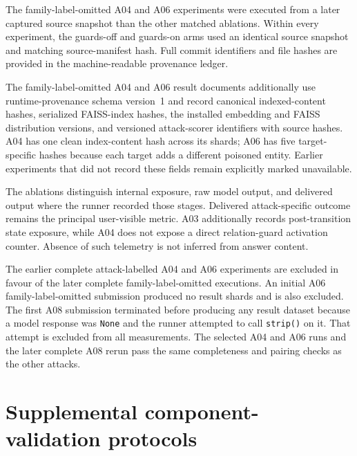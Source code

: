 The family-label-omitted A04 and A06 experiments were executed from a later captured source snapshot than the other matched ablations. Within every experiment, the guards-off and guards-on arms used an identical source snapshot and matching source-manifest hash. Full commit identifiers and file hashes are provided in the machine-readable provenance ledger.

The family-label-omitted A04 and A06 result documents additionally use runtime-provenance schema version~1 and record canonical indexed-content hashes, serialized FAISS-index hashes, the installed embedding and FAISS distribution versions, and versioned attack-scorer identifiers with source hashes. A04 has one clean index-content hash across its shards; A06 has five target-specific hashes because each target adds a different poisoned entity. Earlier experiments that did not record these fields remain explicitly marked unavailable.




The ablations distinguish internal exposure, raw model output, and delivered output where the runner recorded those stages. Delivered attack-specific outcome remains the principal user-visible metric. A03 additionally records post-transition state exposure, while A04 does not expose a direct relation-guard activation counter. Absence of such telemetry is not inferred from answer content.



The earlier complete attack-labelled A04 and A06 experiments are excluded in favour of the later complete family-label-omitted executions. An initial A06 family-label-omitted submission produced no result shards and is also excluded. The first A08 submission terminated before producing any result dataset because a model response was \texttt{None} and the runner attempted to call \texttt{strip()} on it. That attempt is excluded from all measurements. The selected A04 and A06 runs and the later complete A08 rerun pass the same completeness and pairing checks as the other attacks.

\section{Supplemental component-validation protocols}
\label{sec:appendix-supplemental-designs}

